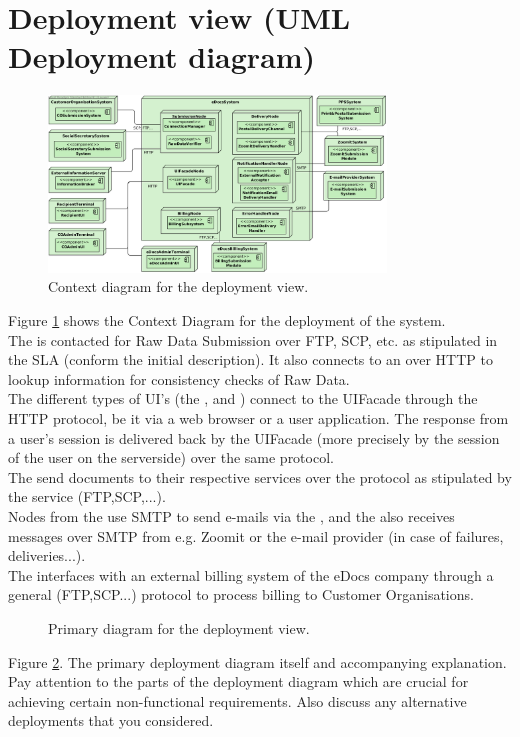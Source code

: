 \section{Deployment view (UML Deployment diagram)}\label{sec:deployment}

\begin{figure}
    \centering
    \includegraphics[width=0.8\textwidth]{figures/Deployment Context.png}
    \caption{Context diagram for the deployment view.}\label{fig:depl_context}
\end{figure}

Figure \ref{fig:depl_context} shows the Context Diagram for the deployment of the system.\\
The  is contacted for Raw Data Submission over FTP, SCP, etc. as stipulated in the SLA (conform the initial description). It also connects to an  over HTTP to lookup information for consistency checks of Raw Data.\\
The different types of UI's (the ,  and ) connect to the UIFacade through the HTTP protocol, be it via a web browser or a user application. The response from a user's session is delivered back by the UIFacade (more precisely by the session of the user on the serverside) over the same protocol.\\
The  send documents to their respective services over the protocol as stipulated by the service (FTP,SCP,...).\\
Nodes from the  use SMTP to send e-mails via the , and the  also receives messages over SMTP from e.g. Zoomit or the e-mail provider (in case of failures, deliveries...).\\
The  interfaces with an external billing system of the eDocs company through a general (FTP,SCP...) protocol to process billing to Customer Organisations.

\begin{figure}[!htp]
    \centering
    \caption{Primary diagram for the deployment view.}\label{fig:depl_primary}
\end{figure}


Figure \ref{fig:depl_primary}. The primary deployment diagram itself and accompanying explanation.
Pay attention to the parts of the deployment diagram which are crucial for
achieving certain non-functional requirements.
Also discuss any alternative deployments that you considered.